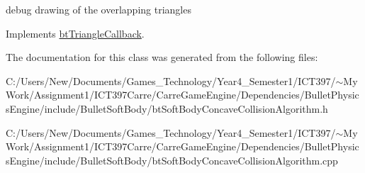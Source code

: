 debug drawing of the overlapping triangles 

Implements \hyperlink{classbt_triangle_callback}{btTriangleCallback}.

The documentation for this class was generated from the following files:\begin{CompactItemize}
\item 
C:/Users/New/Documents/Games\_\-Technology/Year4\_\-Semester1/ICT397/$\sim$My Work/Assignment1/ICT397Carre/CarreGameEngine/Dependencies/BulletPhysicsEngine/include/BulletSoftBody/btSoftBodyConcaveCollisionAlgorithm.h\item 
C:/Users/New/Documents/Games\_\-Technology/Year4\_\-Semester1/ICT397/$\sim$My Work/Assignment1/ICT397Carre/CarreGameEngine/Dependencies/BulletPhysicsEngine/include/BulletSoftBody/btSoftBodyConcaveCollisionAlgorithm.cpp\end{CompactItemize}
